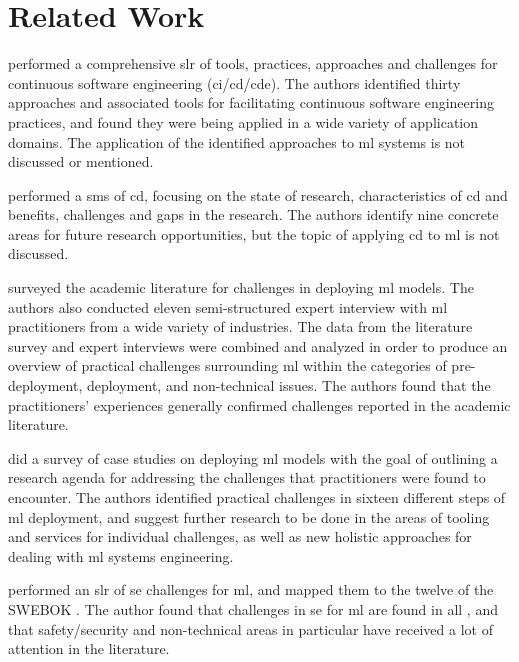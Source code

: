 \chapter{Related Work}
\label{ch:related_work}

\textcite{Shahin2017} performed a comprehensive \acrfull{slr} of tools, practices, approaches and challenges for continuous software engineering (\acrshort{ci}/\acrshort{cd}/\acrshort{cde}).
The authors identified thirty approaches and associated tools for facilitating continuous software engineering practices, and found they were being applied in a wide variety of application domains.
The application of the identified approaches to \acrshort{ml} systems is not discussed or mentioned.

\textcite{Rodriguez2017} performed a \acrfull{sms} of \acrshort{cd}, focusing on the state of research, characteristics of \acrshort{cd} and benefits, challenges and gaps in the research.
The authors identify nine concrete areas for future research opportunities, but the topic of applying \acrshort{cd} to \acrshort{ml} is not discussed.

\textcite{Baier2019} surveyed the academic literature for challenges in deploying \acrshort{ml} models.
The authors also conducted eleven semi-structured expert interview with \acrshort{ml} practitioners from a wide variety of industries.
The data from the literature survey and expert interviews were combined and analyzed in order to produce an overview of practical challenges surrounding \acrshort{ml} within the categories of pre-deployment, deployment, and non-technical issues.
The authors found that the practitioners' experiences generally confirmed challenges reported in the academic literature.

\textcite{Paleyes2020} did a survey of case studies on deploying \acrshort{ml} models with the goal of outlining a research agenda for addressing the challenges that practitioners were found to encounter.
The authors identified practical challenges in sixteen different steps of \acrshort{ml} deployment, and suggest further research to be done in the areas of tooling and services for individual challenges, as well as new holistic approaches for dealing with \acrshort{ml} systems engineering.

\textcite{Kumeno2020} performed an \acrshort{slr} of \acrshort{se} challenges for \acrshort{ml}, and mapped them to the twelve  of the SWEBOK \cite{Bourque2014}.
The author found that challenges in \acrshort{se} for \acrshort{ml} are found in all , and that safety/security and non-technical areas in particular have received a lot of attention in the literature.

